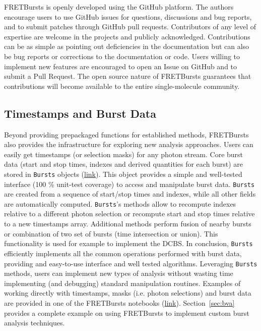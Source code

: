 FRETBursts is openly developed using the GitHub platform.
The authors encourage users to use GitHub issues for questions, discussions
and bug reports, and to submit patches through GitHub pull requests.
Contributors of any level of expertise are welcome in the projects
and publicly acknowledged.
Contributions can be as simple as pointing out deficiencies in the
documentation but can also be bug reports or corrections to
the documentation or code. Users willing to implement
new features are encouraged to open an Issue on GitHub and to submit
a Pull Request. The open source nature of FRETBursts guarantees that
contributions will become available to the entire single-molecule
community.

\subsection{Timestamps and Burst Data}
\label{sec:burststimes}

Beyond providing prepackaged functions for established methods,
FRETBursts also provides the infrastructure for exploring new analysis approaches.
Users can easily get timestamps (or selection masks) for any photon stream.
Core burst data (start and stop times, indexes
and derived quantities for each burst) are stored in \verb|Bursts| objects
(\href{http://fretbursts.readthedocs.org/en/latest/burstsearch.html}{link}).
This object provides a simple and well-tested interface (100 \% unit-test coverage)
to access and manipulate burst data. \verb|Bursts| are created from a sequence of start/stop
times and indexes, while all other fields are automatically
computed. \verb|Bursts|'s methods allow to recompute indexes relative to a different photon
selection or recompute start and stop times relative to a new timestamps array.
Additional methods perform fusion of nearby bursts or combination of two set of bursts
(time intersection or union). This functionality is used for example to implement
the DCBS.
In conclusion, \verb|Bursts| efficiently implements all the common operations performed
with burst data, providing and easy-to-use interface and well tested algorithms.
Leveraging \verb|Bursts| methods, users can implement new types of analysis without
wasting time implementing (and debugging) standard manipulation routines.
Examples of working directly with timestamps, masks (i.e. photon selections) and
burst data are provided in one of the FRETBursts notebooks (\href{http://nbviewer.jupyter.org/github/tritemio/FRETBursts_notebooks/blob/master/notebooks/Example%20-%20Working%20with%20timestamps%20and%20bursts.ipynb}{link}).
Section~\ref{sec:bva} provides a complete example on using FRETBursts to implement 
custom burst analysis techniques.

